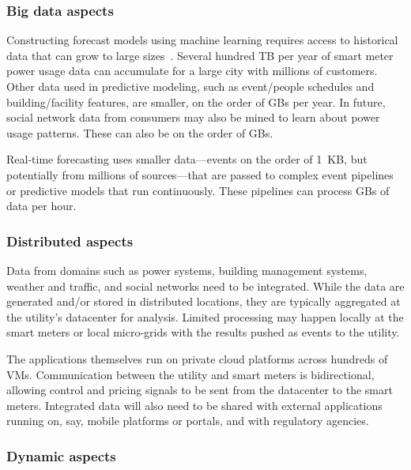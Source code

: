  \subsubsection*{Big data aspects}



Constructing forecast models using machine learning requires access to historical data that can grow to large sizes~\cite{Yin:mapreduce:2012}. Several hundred TB per year of smart meter power usage data  can accumulate for a large city with millions of customers. Other data used in predictive modeling, such as event/people schedules and building/facility features, are smaller, on the order of GBs per year. In future, social network data from consumers may also be mined to learn about power usage patterns. These can also be on the order of GBs.

Real-time forecasting uses smaller data---events on the order of 1~KB, but potentially from millions of sources---that are passed to complex event pipelines or predictive models that run continuously. These pipelines can process GBs of data per hour.

 \subsubsection*{Distributed aspects}



Data from domains such as power systems, building management systems, weather and
traffic, and social networks need to be integrated. While the
data are generated and/or stored in distributed locations, they are typically aggregated at the utility's datacenter for analysis. Limited processing may happen locally at the smart meters or local micro-grids with the results pushed as events to the utility.

The applications themselves run on private cloud platforms across hundreds of VMs. Communication between the utility and smart meters is bidirectional, allowing control and pricing signals to be sent from the datacenter to the smart meters. Integrated data will also need to be shared with external applications running on, say, mobile platforms or portals, and with regulatory agencies.

 \subsubsection*{Dynamic aspects}


